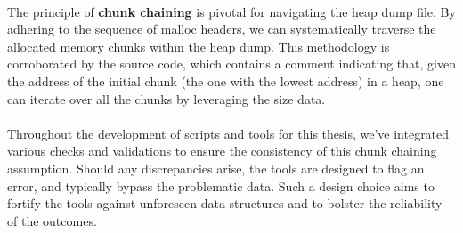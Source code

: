         \paragraph{}The principle of \textbf{chunk chaining}\label{seq:background:chunk_chaining} is pivotal for navigating the heap dump file. By adhering to the sequence of malloc headers, we can systematically traverse the allocated memory chunks within the heap dump. This methodology is corroborated by the source code, which contains a comment indicating that, given the address of the initial chunk (the one with the lowest address) in a heap, one can iterate over all the chunks by leveraging the size data.

        \paragraph{}Throughout the development of scripts and tools for this thesis, we've integrated various checks and validations to ensure the consistency of this chunk chaining assumption. Should any discrepancies arise, the tools are designed to flag an error, and typically bypass the problematic data. Such a design choice aims to fortify the tools against unforeseen data structures and to bolster the reliability of the outcomes.

